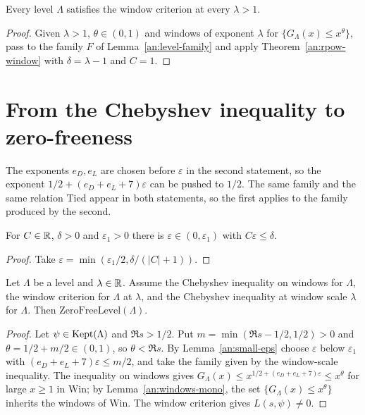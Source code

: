 \begin{theorem}\label{an:formb-thm}
Every level $\Lambda$ satisfies the window criterion at every $\lambda>1$.
\end{theorem}
\begin{proof}
Given $\lambda>1$, $\theta\in(0,1)$ and windows of exponent $\lambda$ for
$\{G_{\Lambda}(x)\le x^{\theta}\}$, pass to the family $F$ of
Lemma~\ref{an:level-family} and apply Theorem~\ref{an:rpow-window} with
$\delta=\lambda-1$ and $C=1$.
\end{proof}

\section{From the Chebyshev inequality to zero-freeness}



\begin{remark}
The exponents $e_D,e_L$ are chosen before $\varepsilon$ in the second
statement, so the exponent $1/2+(e_D+e_L+7)\varepsilon$ can be pushed to
$1/2$. The same family and the same relation $\mathrm{Tied}$ appear in
both statements, so the first applies to the family produced by the
second.
\end{remark}

\begin{lemma}\label{an:small-eps}
For $C\in\mathbb{R}$, $\delta>0$ and $\varepsilon_1>0$ there is
$\varepsilon\in(0,\varepsilon_1)$ with $C\varepsilon\le\delta$.
\end{lemma}
\begin{proof}
Take $\varepsilon=\min(\varepsilon_1/2,\delta/(|C|+1))$.
\end{proof}

\begin{lemma}\label{an:level-tiedwin}
Let $\Lambda$ be a level and $\lambda\in\mathbb{R}$. Assume the Chebyshev
inequality on windows for $\Lambda$, the window criterion for $\Lambda$ at
$\lambda$, and the Chebyshev inequality at window scale $\lambda$ for
$\Lambda$. Then $\mathrm{ZeroFreeLevel}(\Lambda)$.
\end{lemma}
\begin{proof}
Let $\psi\in\operatorname{Kept}(\Lambda)$ and $\Re s>1/2$. Put
$m=\min(\Re s-1/2,1/2)>0$ and $\theta=1/2+m/2\in(0,1)$, so
$\theta<\Re s$. By Lemma~\ref{an:small-eps} choose $\varepsilon$ below
$\varepsilon_1$ with $(e_D+e_L+7)\varepsilon\le m/2$, and take the family
given by the window-scale inequality. The inequality on windows gives
$G_{\Lambda}(x)\le x^{1/2+(e_D+e_L+7)\varepsilon}\le x^{\theta}$ for large
$x\ge1$ in $\mathrm{Win}$; by Lemma~\ref{an:windows-mono}, the set
$\{G_{\Lambda}(x)\le x^{\theta}\}$ inherits the windows of $\mathrm{Win}$.
The window criterion gives $L(s,\psi)\ne0$.
\end{proof}

